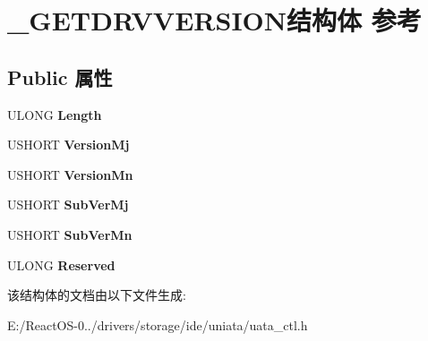 \hypertarget{struct___g_e_t_d_r_v_v_e_r_s_i_o_n}{}\section{\+\_\+\+G\+E\+T\+D\+R\+V\+V\+E\+R\+S\+I\+O\+N结构体 参考}
\label{struct___g_e_t_d_r_v_v_e_r_s_i_o_n}
\subsection*{Public 属性}
\begin{DoxyCompactItemize}
\item 
\mbox{\label{struct___g_e_t_d_r_v_v_e_r_s_i_o_n_a720c35abcbb080db57824bb0770e988d}} 
U\+L\+O\+NG {\bfseries Length}
\item 
\mbox{\label{struct___g_e_t_d_r_v_v_e_r_s_i_o_n_a2bdb8f2970150e54430f19c9b869b724}} 
U\+S\+H\+O\+RT {\bfseries Version\+Mj}
\item 
\mbox{\label{struct___g_e_t_d_r_v_v_e_r_s_i_o_n_a6c1df4dbe21ac5cbc3cb6cb8bc22dab1}} 
U\+S\+H\+O\+RT {\bfseries Version\+Mn}
\item 
\mbox{\label{struct___g_e_t_d_r_v_v_e_r_s_i_o_n_a5b2c5de413bb90dbe5ceee1d3c38eb09}} 
U\+S\+H\+O\+RT {\bfseries Sub\+Ver\+Mj}
\item 
\mbox{\label{struct___g_e_t_d_r_v_v_e_r_s_i_o_n_a3c35c5915a02cee5b55450410da10e35}} 
U\+S\+H\+O\+RT {\bfseries Sub\+Ver\+Mn}
\item 
\mbox{\label{struct___g_e_t_d_r_v_v_e_r_s_i_o_n_a02ad3f3d19e3cc209f44cae48b5a01b9}} 
U\+L\+O\+NG {\bfseries Reserved}
\end{DoxyCompactItemize}


该结构体的文档由以下文件生成\+:\begin{DoxyCompactItemize}
\item 
E\+:/\+React\+O\+S-\/0../drivers/storage/ide/uniata/uata\+\_\+ctl.\+h\end{DoxyCompactItemize}
